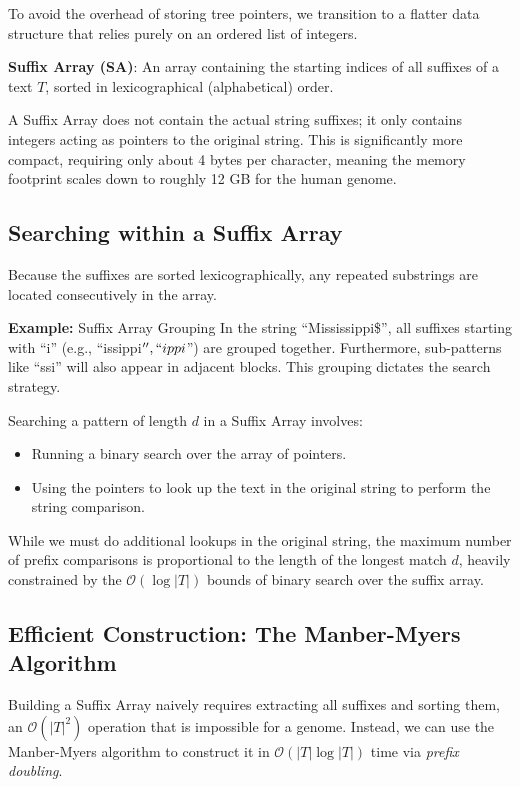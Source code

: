 To avoid the overhead of storing tree pointers, we transition to a flatter data structure that relies purely on an ordered list of integers.

\begin{important}
  \textbf{Suffix Array (SA)}: An array containing the starting indices of all suffixes of a text \( T \), sorted in lexicographical (alphabetical) order.
\end{important}

A Suffix Array does not contain the actual string suffixes; it only contains integers acting as pointers to the original string. This is significantly more compact, requiring only about 4 bytes per character, meaning the memory footprint scales down to roughly 12 GB for the human genome.

\subsection{Searching within a Suffix Array}
Because the suffixes are sorted lexicographically, any repeated substrings are located consecutively in the array. 

\textbf{Example:} Suffix Array Grouping
In the string ``Mississippi\$'', all suffixes starting with ``i'' (e.g., ``issippi$'', ``ippi$'') are grouped together. Furthermore, sub-patterns like ``ssi'' will also appear in adjacent blocks. This grouping dictates the search strategy.

Searching a pattern of length \( d \) in a Suffix Array involves:
\begin{itemize}
    \item Running a binary search over the array of pointers.
    \item Using the pointers to look up the text in the original string to perform the string comparison.
\end{itemize}
While we must do additional lookups in the original string, the maximum number of prefix comparisons is proportional to the length of the longest match \( d \), heavily constrained by the \( \mathcal{O}(\log |T|) \) bounds of binary search over the suffix array.

\subsection{Efficient Construction: The Manber-Myers Algorithm}
Building a Suffix Array naively requires extracting all suffixes and sorting them, an \( \mathcal{O}(|T|^2) \) operation that is impossible for a genome. Instead, we can use the Manber-Myers algorithm to construct it in \( \mathcal{O}(|T| \log |T|) \) time via \textit{prefix doubling}.


